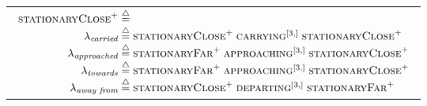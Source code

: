 \begin{table}
{\begin{tabular}{@{}c@{}}
\begin{math}
\begin{array}[t]{r@{\;\define\;}l}
          \textsc{stationaryClose}\plus\\
          \lambda_{\textit{carried}} &
          \textsc{stationaryClose}\plus\;
          \textsc{carrying}\dagr\;
          \textsc{stationaryClose}\plus\\
          \lambda_{\textit{approached}} &
          \textsc{stationaryFar}\plus\;
          \textsc{approaching}\dagr\;
          \textsc{stationaryClose}\plus\\
          \lambda_{\textit{towards}} &
          \textsc{stationaryFar}\plus\;
          \textsc{approaching}\dagr\;
          \textsc{stationaryClose}\plus\\
          \lambda_{\textit{away from}} &
          \textsc{stationaryClose}\plus\;
          \textsc{departing}\dagr\;
          \textsc{stationaryFar}\plus
        \end{array}
      \end{math}
    \end{tabular}}
\end{table}

